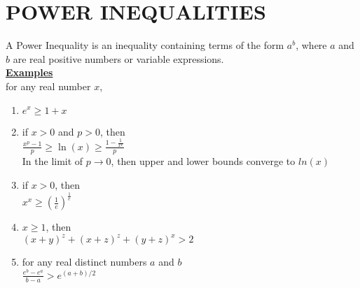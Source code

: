 \documentclass[12pt]{report}
\newcommand{\ubt}[1]{\textbf{\underline{#1}}}
\newcommand{\spn}[1]{\\[#1cm]}
\newcommand{\NI}{\noindent}
\newcommand{\dsp}{\displaystyle}
\begin{document}
	\section{POWER INEQUALITIES}
	A Power Inequality is an inequality containing terms of the form $a^b$, where $a$ and $b$ are real positive numbers or variable expressions.\spn{0.4}
	\ubt{Examples}\\
	for any real number $x$,
	\begin{enumerate}
		\item $e^x \geq 1 + x$
		\item if $\displaystyle x>0$ and $p>0$, then \\ $\frac{x^p-1}{p} \geq \ln(x) \geq \frac{1-\frac{1}{x^p}}{p}$ \\
		
		\NI In the limit of $p\rightarrow 0$, then upper and lower bounds converge to $ln(x)$
		
		\item if $x>0$, then \\
		     $\displaystyle x^x \geq (\frac{1}{e})^{\frac{1}{e}}$
		
		\item $x \geq 1$, then\\
			$\dsp (x+y)^z + (x+z)^z + (y+z)^x > 2$
			
		\item for any real distinct numbers $a$ and $b$\\
			$\dsp \frac{e^b - e^a}{b-a} > e^{(a+b)/2}$
	\end{enumerate}
	
\end{document}
